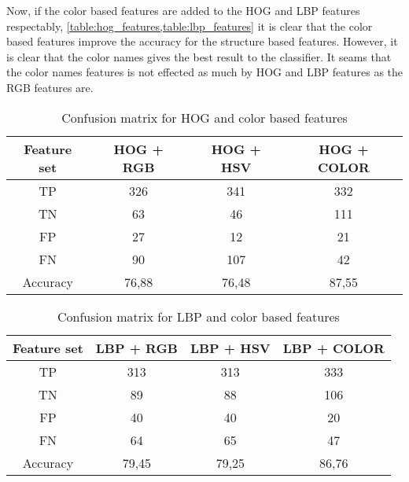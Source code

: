 Now, if the color based features are added to the HOG and LBP features respectably, \cref{table:hog_features,table:lbp_features} it is clear that the color based features improve the accuracy for the structure based features. However, it is clear that the color names gives the best result to the classifier. It seams that the color names features is not effected as much by HOG and LBP features as the RGB features are. 

\FloatBarrier
\begin{table}[h!]
	\begin{center}
		\caption{Confusion matrix for HOG and color based features}
		\begin{tabular}{|c|c|c|c|}
			\hline
			Feature set & HOG + RGB & HOG + HSV & HOG + COLOR \\ \hline
			    TP      &    326    &    341    &     332     \\ \hline
			    TN      &    63     &    46     &     111     \\ \hline
			    FP      &    27     &    12     &     21      \\ \hline
			    FN      &    90     &    107    &     42      \\ \hline
			 Accuracy   &   76,88   &   76,48   &    87,55    \\ \hline
		\end{tabular}
		
		\label{table:hog_features}
	\end{center}
\end{table}
\FloatBarrier

\FloatBarrier
\begin{table}[h!]
	\begin{center}
		\caption{Confusion matrix for LBP and color based features}
		\begin{tabular}{|c|c|c|c|}
			\hline
			Feature set & LBP + RGB & LBP + HSV & LBP + COLOR   \\ \hline
			    TP      &    313    &    313    &     333       \\ \hline
			    TN      &    89     &    88     &     106       \\ \hline
			    FP      &    40     &    40     &     20        \\ \hline
			    FN      &    64     &    65     &     47        \\ \hline
			 Accuracy   &   79,45   &   79,25   &    86,76      \\ \hline
		\end{tabular}
		\label{table:lbp_features}
	\end{center}
\end{table}
\FloatBarrier

